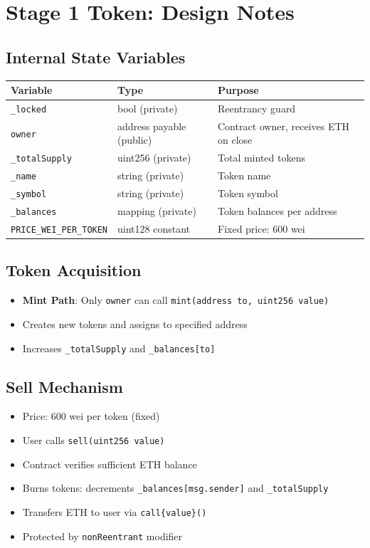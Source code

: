 \documentclass[10pt,a4paper]{article}
\begin{document}
\section{Stage 1 Token: Design Notes}

\subsection*{Internal State Variables}

\begin{table}[!htbp]
\centering
\begin{tabularx}{\textwidth}{l l X}
\toprule
\textbf{Variable} & \textbf{Type} & \textbf{Purpose} \\
\midrule
\texttt{\_locked} & bool (private) & Reentrancy guard \\
\texttt{owner} & address payable (public) & Contract owner, receives ETH on close \\
\texttt{\_totalSupply} & uint256 (private) & Total minted tokens \\
\texttt{\_name} & string (private) & Token name \\
\texttt{\_symbol} & string (private) & Token symbol \\
\texttt{\_balances} & mapping (private) & Token balances per address \\
\texttt{PRICE\_WEI\_PER\_TOKEN} & uint128 constant & Fixed price: 600 wei \\
\bottomrule
\end{tabularx}
\end{table}

\subsection*{Token Acquisition}
\begin{itemize}
    \item \textbf{Mint Path}: Only \texttt{owner} can call \texttt{mint(address to, uint256 value)}
    \item Creates new tokens and assigns to specified address
    \item Increases \texttt{\_totalSupply} and \texttt{\_balances[to]}
\end{itemize}

\subsection*{Sell Mechanism}
\begin{itemize}
    \item Price: 600 wei per token (fixed)
    \item User calls \texttt{sell(uint256 value)}
    \item Contract verifies sufficient ETH balance
    \item Burns tokens: decrements \texttt{\_balances[msg.sender]} and \texttt{\_totalSupply}
    \item Transfers ETH to user via \texttt{call\{value\}()}
    \item Protected by \texttt{nonReentrant} modifier
\end{itemize}
\end{document}
